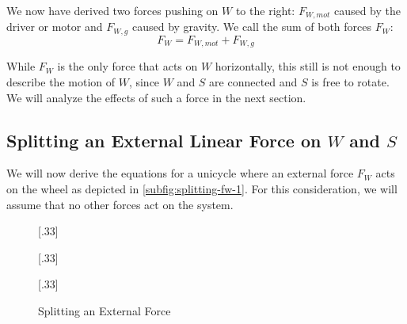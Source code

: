 \documentclass[copyright,submission]{eptcs}
\newcommand{\mi}[1]{\mathit{#1}}
\newcommand{\surface}{
    \begin{scope}[transparency group]
        \clip (-2,0) rectangle (2,-1);
        \draw[scope fading=south] (-2,0) rectangle (2,-1);
        \foreach \x in {-2,-1.75,...,3}
            \draw (\x,0) -- ($(\x,0) - (1,1)$);
    \end{scope}
}
\newcommand{\wheel}{
    \draw (0, 1) circle (1);
    \draw[fill] (0, 1) circle (0.05);
}
\newcommand{\saddle}[1][110]{
    \draw (0, 1) -- ([shift=(#1:3)] 0,1);
    \draw[fill] ([shift=(#1:0)] 0,1) circle (0.05);
    \draw[fill] ([shift=(#1:2)] 0,1) circle (0.03);
    \draw[fill] ([shift=(#1:3)] 0,1) circle (0.05);
}
\newcommand{\angletheta}[1][110]{
    \draw[dashed] (0, 1) -- (0, 3);
    \draw[dashed] ([shift=(90:1.5)] 0,1) arc (90:#1:1.5) node [midway, below] {$\theta$};
}
\begin{document}
We now have derived two forces pushing on $W$ to the right: $F_{W, \mi{mot}}$ caused by the driver or motor and $F_{W, g}$ caused by gravity. We call the sum of both forces $F_W$:
\begin{equation}\label{eqn:defining-f-w}
    F_W = F_{W, \mi{mot}} + F_{W, g}
\end{equation}

While $F_W$ is the only force that acts on $W$ horizontally, this still is not enough to describe the motion of $W$, since $W$ and $S$ are connected and $S$ is free to rotate. We will analyze the effects of such a force in the next section.


\subsection{Splitting an External Linear Force on \texorpdfstring{$W$}{W} and \texorpdfstring{$S$}{S}}\label{sct:splitting-fw}

We will now derive the equations for a unicycle where an external force $F_W$ acts on the wheel as depicted in \cref{subfig:splitting-fw-1}. For this consideration, we will assume that no other forces act on the system.

\begin{figure}\centering
    [.33\linewidth]{
        \centering{}
    }[.33\linewidth]{
        \centering{}
    }[.33\linewidth]{
        \centering{}
    }
    \caption{\label{fig:splitting-fw} Splitting an External Force}
\end{figure}
\end{document}
